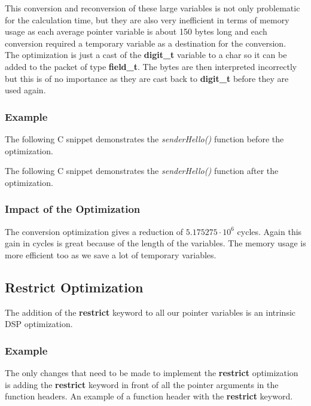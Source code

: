 \documentclass[a4paper]{article}
\begin{document}
This conversion and reconversion of these large variables is not only problematic for the calculation time, but they are also very inefficient in terms of memory usage as each average pointer variable is about 150 bytes long and each conversion required a temporary variable as a destination for the conversion.\\

The optimization is just a cast of the \textbf{digit\_t} variable to a char so it can be added to the packet of type \textbf{field\_t}. The bytes are then interpreted incorrectly but this is of no importance as they are cast back to \textbf{digit\_t} before they are used again.

\subsubsection{Example}

The following C snippet demonstrates the \textit{senderHello()} function before the optimization.


The following C snippet demonstrates the \textit{senderHello()} function after the optimization.


\subsubsection{Impact of the Optimization}

The conversion optimization gives a reduction of $5.175275 \cdot 10^{6}$ cycles. Again this gain in cycles is great because of the length of the variables. The memory usage is more efficient too as we save a lot of temporary variables.

\subsection{Restrict Optimization}

The addition of the \textbf{restrict} keyword to all our pointer variables is an intrinsic DSP optimization.

\subsubsection{Example}

The only changes that need to be made to implement the \textbf{restrict} optimization is adding the \textbf{restrict} keyword in front of all the pointer arguments in the function headers. An example of a function header with the \textbf{restrict} keyword.

\end{document}
